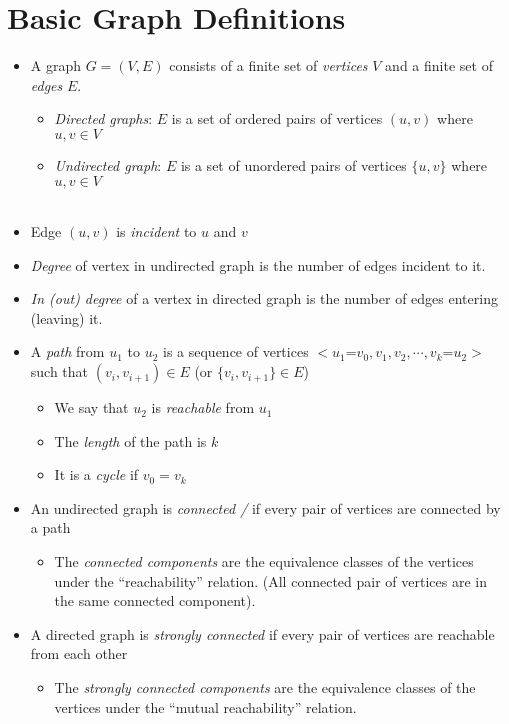 \section{Basic Graph Definitions}
\begin{itemize}
	\item A graph $G = (V,E)$ consists of a finite set of {\em vertices} $V$
	and a finite set of {\em edges} $E$.
	\begin{itemize}
		\item {\em Directed graphs}: $E$ is a set of ordered pairs of vertices
		$(u,v)$ where $u,v \in V$ \\
		\item {\em Undirected graph}: $E$ is a set of unordered pairs of
		vertices $\{u,v\}$ where $u,v \in V$ \\ \\
	\end{itemize}
	\item Edge $(u,v)$ is {\em incident} to $u$ and $v$
	\item {\em Degree} of vertex in undirected graph is the number of edges
	incident to it.
	\item {\em In (out) degree} of a vertex in directed graph is the number of
	edges entering (leaving) it.
	\item A {\em path} from $u_1$ to $u_2$ is a sequence of vertices
	$<u_1$=$v_0,v_1,v_2, \cdots , v_k$=$u_2>$ such that $(v_i,v_{i+1}) \in E$
	(or $\{v_i,v_{i+1}\} \in E$)
	\begin{itemize}
		\item We say that $u_2$ is {\em reachable} from $u_1$
		\item The {\em length} of the path is $k$
		\item It is a {\em cycle } if $v_0 = v_k$
	\end{itemize}
	
	
	\item An undirected graph is {\em connected /} if every pair of vertices are
	connected by a path
	\begin{itemize}
		\item The {\em connected components } are the equivalence classes of
		the vertices under the ``reachability'' relation. (All connected
		pair of vertices are in the same connected component).
	\end{itemize}
	\item A directed graph is {\em strongly connected } if every pair of
	vertices are reachable from each other
	\begin{itemize}
		\item The {\em strongly connected components } are the equivalence
		classes of the vertices under the ``mutual reachability'' relation. 
	\end{itemize}
	

\end{itemize}
